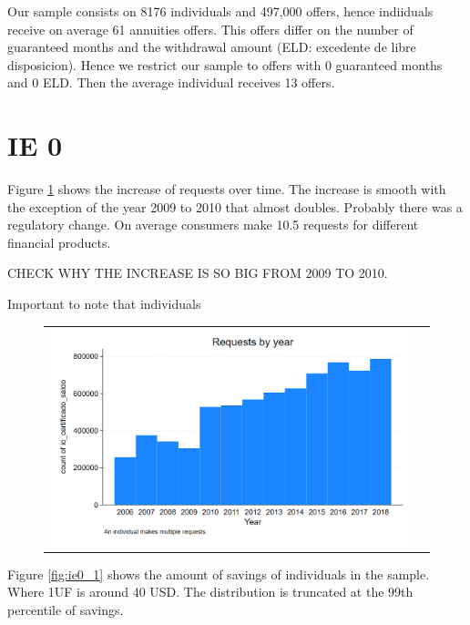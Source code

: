 \documentclass[12pt]{article}
\begin{document}
Our sample consists on 8176 individuals and 497,000 offers, hence indiiduals receive on average 61 annuities offers. This offers differ on the number of guaranteed months and the withdrawal amount (ELD: excedente de libre disposicion). Hence we restrict our sample to offers with 0 guaranteed months and 0 ELD. Then the average individual receives 13 offers. 








\section{IE 0}

Figure \ref{fig:ie0_0} shows the increase of requests over time. The increase is smooth with the exception of the year 2009 to 2010 that almost doubles. Probably there was a regulatory change. 
On average consumers make 10.5 requests for different financial products. 

CHECK WHY THE INCREASE IS SO BIG FROM 2009 TO 2010.

Important to note that individuals 
\begin{figure}[H]
\caption{}
\label{fig:ie0_0}
\centering{}%
\begin{tabular}{cc}
\includegraphics[scale=0.27]{figures/IE0_plot0.png}
\end{tabular}
\end{figure}


Figure \ref{fig:ie0_1} shows the amount of savings of individuals in the sample. Where 1UF is around 40 USD. The distribution is truncated at the 99th percentile of savings. 
\end{document}
